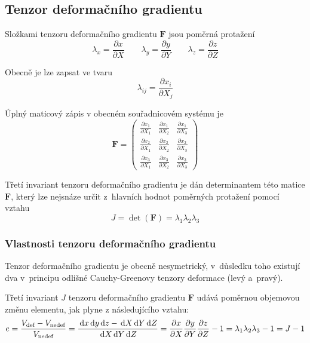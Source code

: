 
\subsection{Tenzor deformačního gradientu}
Složkami tenzoru deformačního gradientu $\bm{F}$ jsou poměrná protažení
\begin{equation}
	\lambda_x  = \frac{\partial x}{\partial X}
	\qquad
	\lambda_y  = \frac{\partial y}{\partial Y}
	\qquad
	\lambda_z  = \frac{\partial z}{\partial Z}
\end{equation}

Obecně je lze zapsat ve tvaru
\begin{equation}
	\lambda_{ij}  = \frac{\partial x_i}{\partial X_j}
\end{equation}

Úplný maticový zápis v obecném souřadnicovém systému je
\begin{equation}
	\bm{F} = \left(\begin{matrix}
		\frac{\partial x_1}{\partial X_1} & \frac{\partial x_1}{\partial X_2} & \frac{\partial x_1}{\partial X_3}\\
		\frac{\partial x_2}{\partial X_1} & \frac{\partial x_2}{\partial X_2} & \frac{\partial x_2}{\partial X_3}\\
		\frac{\partial x_3}{\partial X_1} & \frac{\partial x_3}{\partial X_2} & \frac{\partial x_3}{\partial X_3}
	\end{matrix}\right)
\end{equation}

Třetí invariant tenzoru deformačního gradientu je dán determinantem této matice $\bm{F}$, který lze nejsnáze určit z~hlavních hodnot poměrných protažení pomocí vztahu
\begin{equation}
	J = \det(\bm{F}) = \lambda_1 \lambda_2 \lambda_3
\end{equation}

\subsubsection{Vlastnosti tenzoru deformačního gradientu}
Tenzor deformačního gradientu je obecně nesymetrický, v~důsledku toho existují dva v~principu odlišné Cauchy-Greenovy tenzory deformace (levý a~pravý).

Třetí invariant $J$ tenzoru deformačního gradientu $\bm{F}$ udává poměrnou objemovou změnu elementu, jak plyne z následujícího vztahu: 
\begin{equation}
	e
	= \frac{V_\text{def} - V_\text{nedef}}{V_\text{nedef}}
	= \frac{\,\mathrm{d} x \,\mathrm{d} y \,\mathrm{d} z - \,\mathrm{d} X \,\mathrm{d} Y \,\mathrm{d} Z}{\,\mathrm{d} X \,\mathrm{d} Y \,\mathrm{d} Z}
	= \frac{\partial x}{\partial X} \frac{\partial y}{\partial Y} \frac{\partial z}{\partial Z} - 1
	= \lambda_1 \lambda_2 \lambda_3 -1
	= J - 1
\end{equation}

